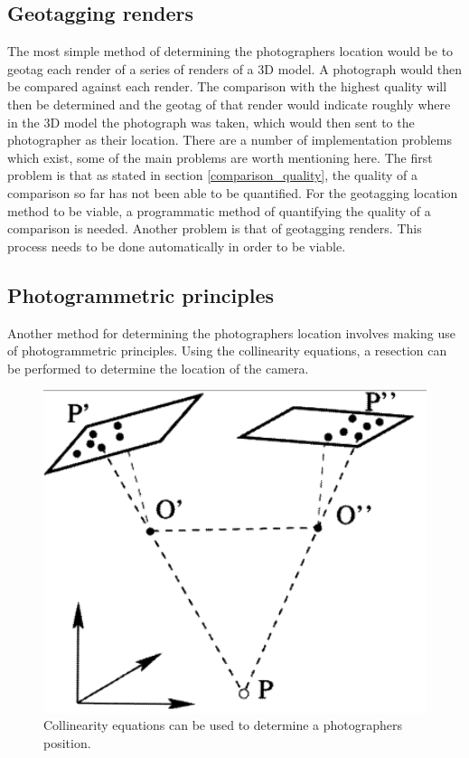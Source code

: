 \documentclass[11pt,a4paper]{report}
\begin{document}
		\subsection{Geotagging renders}
			The most simple method of determining the photographers location would be to geotag each render of a series of renders of a 3D model. A photograph would then be compared against each render. The comparison with the highest quality will then be determined and the geotag of that render would indicate roughly where in the 3D model the photograph was taken, which would then sent to the photographer as their location.
			There are a number of implementation problems which exist, some of the main problems are worth mentioning here.
			The first problem is that as stated in section \ref{comparison_quality}, the quality of a comparison so far has not been able to be quantified. For the geotagging location method to be viable, a programmatic method of quantifying the quality of a comparison is needed.
			Another problem is that of geotagging renders. This process needs to be done automatically in order to be viable.
			
		\subsection{Photogrammetric principles}
			Another method for determining the photographers location involves making use of photogrammetric principles. Using the collinearity equations, a resection can be performed to determine the location of the camera.
			\begin{figure}[H]
				\centering
				\includegraphics[width=1\textwidth]{collinearity_equations}
				\caption[Collinearity Equations]{Collinearity equations can be used to determine a photographers position.}
				\label{fig:collinearity_equations}
			\end{figure}
			
\end{document}
